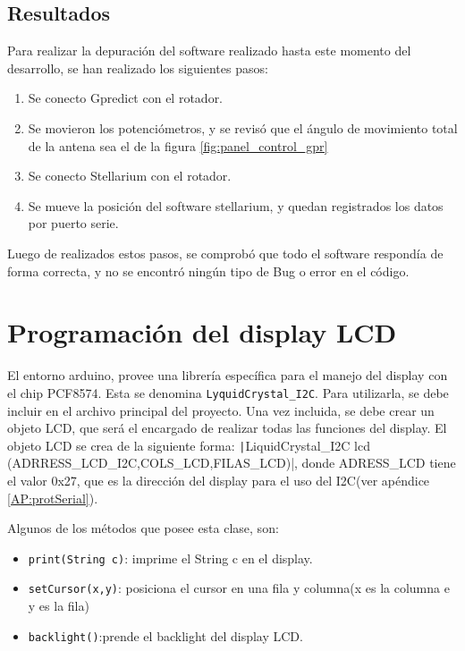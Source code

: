 \subsection{Resultados}
Para realizar la depuración del software realizado hasta este momento del desarrollo, se han realizado los siguientes pasos: 
\begin{enumerate}
	\item Se conecto Gpredict con el rotador. 
	\item Se movieron los potenciómetros, y se revisó que el ángulo de movimiento total de la antena sea el de la figura \ref{fig:panel_control_gpr}
	\item Se conecto Stellarium con el rotador.
	\item Se mueve la posición del software stellarium, y quedan registrados los datos por puerto serie.
\end{enumerate}


Luego de realizados estos pasos, se comprobó que todo el software respondía de forma correcta, y no se encontró ningún tipo de Bug o error en el código.

\section{Programación del display LCD} 

El entorno arduino, provee una librería específica para el manejo del display con el chip PCF8574. Esta se denomina \texttt{LyquidCrystal_I2C}. Para utilizarla, se debe incluir en el archivo principal del proyecto. Una vez incluida, se debe crear un objeto LCD, que será el encargado de realizar todas las funciones del display. El objeto LCD se crea de la siguiente forma: 
\texttt|LiquidCrystal_I2C lcd (ADRRESS_LCD_I2C,COLS_LCD,FILAS_LCD)|,
donde ADRESS\_LCD tiene el valor 0x27, que es la dirección del display para el uso del I2C(ver apéndice \ref{AP:protSerial}). 

Algunos de los métodos que posee esta clase, son: 
\begin{itemize}
	\item \texttt{print(String c)}: imprime el String c en el display. 
	\item \texttt{setCursor(x,y)}: posiciona el cursor en una fila y columna(x es la columna e y es la fila) 
	\item \texttt{backlight()}:prende el backlight del display LCD.   
\end{itemize}

